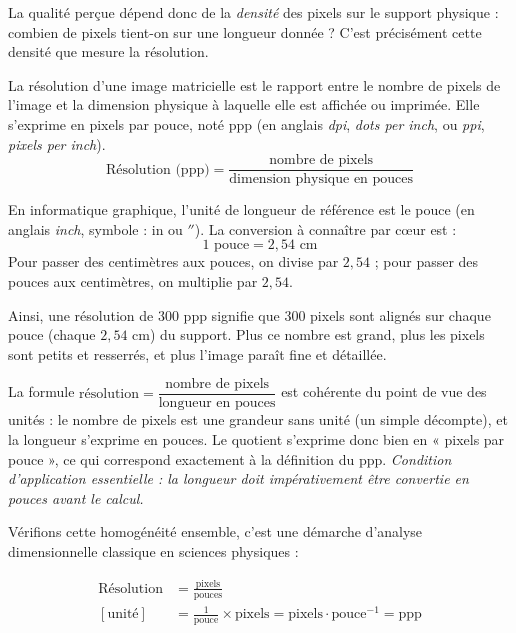 \documentclass[11pt]{article}
\newcommand{\cle}[1]{{\popxbold\color{popdark}#1}}
\newcounter{popsec}
\newcounter{popsub}
\newcommand{\courssub}[1]{%
  \stepcounter{popsub}%
  \par\vspace{9pt}\noindent{\popxbold\fontsize{11.5}{13}\selectfont\color{popink}{\color{poporange}\thepopsec.\thepopsub}\hspace{6pt}#1}\par\nopagebreak\vspace{4pt}
}
\begin{document}
La qualité perçue dépend donc de la \emph{densité} des pixels sur le support physique : combien de pixels tient-on sur une longueur donnée ? C'est précisément cette densité que mesure la résolution.

\courssub{Définition de la résolution}

\begin{definition}
La \cle{résolution} d'une image matricielle est le rapport entre le nombre de pixels de l'image et la dimension physique à laquelle elle est affichée ou imprimée. Elle s'exprime en \cle{pixels par pouce}, noté \cle{ppp} (en anglais \emph{dpi}, \emph{dots per inch}, ou \emph{ppi}, \emph{pixels per inch}).
\[
\text{Résolution (ppp)} = \frac{\text{nombre de pixels}}{\text{dimension physique en pouces}}
\]
\end{definition}

\begin{aretenir}
En informatique graphique, l'unité de longueur de référence est le \cle{pouce} (en anglais \emph{inch}, symbole : in ou $''$). La conversion à connaître par cœur est :
\[
1 \text{ pouce} = 2{,}54 \text{ cm}
\]
Pour passer des centimètres aux pouces, on divise par $2{,}54$ ; pour passer des pouces aux centimètres, on multiplie par $2{,}54$.
\end{aretenir}

Ainsi, une résolution de $300$ ppp signifie que $300$ pixels sont alignés sur chaque pouce (chaque $2{,}54$ cm) du support. Plus ce nombre est grand, plus les pixels sont petits et resserrés, et plus l'image paraît fine et détaillée.

\begin{propriete}
La formule $\text{résolution} = \dfrac{\text{nombre de pixels}}{\text{longueur en pouces}}$ est cohérente du point de vue des unités : le nombre de pixels est une grandeur sans unité (un simple décompte), et la longueur s'exprime en pouces. Le quotient s'exprime donc bien en « pixels par pouce », ce qui correspond exactement à la définition du ppp. \emph{Condition d'application essentielle : la longueur doit impérativement être convertie en pouces avant le calcul.}
\end{propriete}

Vérifions cette homogénéité ensemble, c'est une démarche d'analyse dimensionnelle classique en sciences physiques :

\begin{align*}
\text{Résolution} &= \frac{\text{pixels}}{\text{pouces}} \\
[\text{unité}] &= \frac{1}{\text{pouce}} \times \text{pixels} = \text{pixels} \cdot \text{pouce}^{-1} = \text{ppp}
\end{align*}
\end{document}
